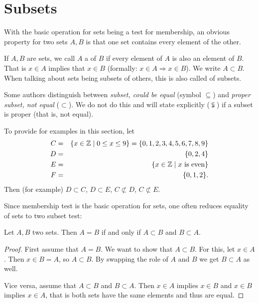 \section{Subsets}
\label{secsubsets}

With the basic operation for sets being a test for membership, an obvious
property for two sets $A,B$ is that one set contains every element of the
other.

\begin{defn}
If $A,B$ are sets, we call $A$ a  of $B$ if every element of
$A$ is also an element of $B$. That is $x\in A$ implies that $x\in B$
(formally: $x\in A\Rightarrow x\in B$). We write $A\subset B$.
When talking about sets being subsets of others, this is also called
 of subsets.
\end{defn}
\begin{note}
Some authors distinguish between {\em subset, could be equal} (symbol
$\subseteq$) and {\em proper subset, not equal} ($\subset$). We do not do
this and will state explicitly ($\subsetneqq$) if a subset is
proper (that is, not equal).
\end{note}

To provide for examples in this section, let
\begin{eqnarray*}
C&=&\{x\in{\mathbb Z}\mid 0\le x\le9\}=\{0,1,2,3,4,5,6,7,8,9\}\\
D&=&\{0,2,4\}\\
E&=&\{x\in{\mathbb Z}\mid \mbox{$x$ is even}\}\\
F&=&\{0,1,2\}.\\
\end{eqnarray*}
Then (for example) $D\subset C$, $D\subset E$, $C\not\subset D$,
$C\not\subset E$.

Since membership test is the basic operation for sets, one often reduces
equality of sets to two subset test:
\begin{lemma}
\label{lemseteq}
Let $A,B$ two sets. Then $A=B$ if and only if $A\subset B$ and $B\subset A$.
\end{lemma}
\begin{proof}
First assume that $A=B$. We want to show that $A\subset B$. For this, let
$x\in A$. Then $x\in B=A$, so $A\subset B$. By swapping the role of $A$ and
$B$ we get $B\subset A$ as well.

Vice versa, assume that $A\subset B$ and $B\subset A$. Then $x\in A$ implies
$x\in B$ and $x\in B$ implies $x\in A$, that is both sets have the same
elements and thus are equal.
\end{proof}

